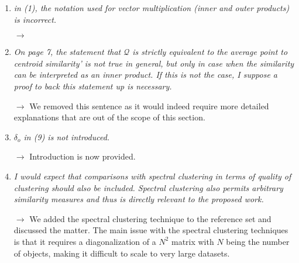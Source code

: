 \documentclass[10pt]{article}
\begin{document}
\begin{enumerate}
\item \emph{in (1), the notation used for vector multiplication (inner and outer products) is incorrect.}

$\rightarrow$

\item \emph{On page 7, the statement that $\mathcal{Q}$ is strictly equivalent to the average point to centroid similarity' is not true in general, but only in case when the similarity can be interpreted as an inner product. If this is not the case, I suppose a proof to back this statement up is necessary.}

$\rightarrow$ We removed this sentence as it would indeed require more detailed explanations that are out of the scope of this section.

\item \emph{$\delta_o$ in (9) is not introduced.}

$\rightarrow$ Introduction is now provided.

\item \emph{I would expect that comparisons with spectral clustering in terms of quality of clustering should also be included. Spectral clustering also permits arbitrary similarity measures and thus is directly relevant to the proposed work.}

$\rightarrow$ We added the spectral clustering technique to the reference set and discussed the matter. The main issue with the spectral clustering techniques is that it requires a diagonalization of a $N^2$ matrix with $N$ being the number of objects, making it difficult to scale to very large datasets.

\end{enumerate}
\end{document}
